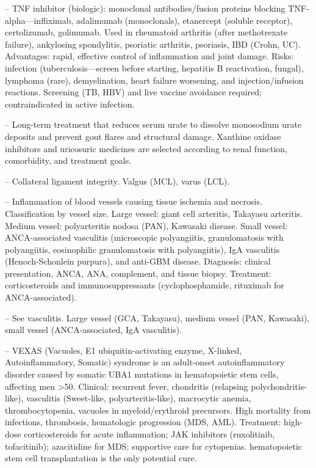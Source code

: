 -- TNF inhibitor (biologic): monoclonal antibodies/fusion proteins blocking TNF-alpha—infliximab, adalimumab (monoclonals), etanercept (soluble receptor), certolizumab, golimumab. Used in rheumatoid arthritis (after methotrexate failure), ankylosing spondylitis, psoriatic arthritis, psoriasis, IBD (Crohn, UC). Advantages: rapid, effective control of inflammation and joint damage. Risks: infection (tuberculosis—screen before starting, hepatitis B reactivation, fungal), lymphoma (rare), demyelination, heart failure worsening, and injection/infusion reactions. Screening (TB, HBV) and live vaccine avoidance required; contraindicated in active infection.

-- Long-term treatment that reduces serum urate to dissolve monosodium urate deposits and prevent gout flares and structural damage. Xanthine oxidase inhibitors and uricosuric medicines are selected according to renal function, comorbidity, and treatment goals.

-- Collateral ligament integrity. Valgus (MCL), varus (LCL).

-- Inflammation of blood vessels causing tissue ischemia and necrosis. Classification by vessel size. Large vessel: giant cell arteritis, Takayasu arteritis. Medium vessel: polyarteritis nodosa (PAN), Kawasaki disease. Small vessel: ANCA-associated vasculitis (microscopic polyangiitis, granulomatosis with polyangiitis, eosinophilic granulomatosis with polyangiitis), IgA vasculitis (Henoch-Schonlein purpura), and anti-GBM disease. Diagnosis: clinical presentation, ANCA, ANA, complement, and tissue biopsy. Treatment: corticosteroids and immunosuppressants (cyclophosphamide, rituximab for ANCA-associated).

-- See vasculitis. Large vessel (GCA, Takayasu), medium vessel (PAN, Kawasaki), small vessel (ANCA-associated, IgA vasculitis).

-- VEXAS (Vacuoles, E1 ubiquitin-activating enzyme, X-linked, Autoinflammatory, Somatic) syndrome is an adult-onset autoinflammatory disorder caused by somatic UBA1 mutations in hematopoietic stem cells, affecting men >50. Clinical: recurrent fever, chondritis (relapsing polychondritis-like), vasculitis (Sweet-like, polyarteritis-like), macrocytic anemia, thrombocytopenia, vacuoles in myeloid/erythroid precursors. High mortality from infections, thrombosis, hematologic progression (MDS, AML). Treatment: high-dose corticosteroids for acute inflammation; JAK inhibitors (ruxolitinib, tofacitinib); azacitidine for MDS; supportive care for cytopenias. hematopoietic stem cell transplantation is the only potential cure.
